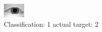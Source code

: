 \begin{figure}[h!]
\begin{center}
\includegraphics[width=0.60\columnwidth]{figures/ID866_class_1_target_2.png}
\end{center}
\caption{ Classification: 1 actual target: 2}
\label{fig:ID866_class_1_target_2}
\end{figure}
